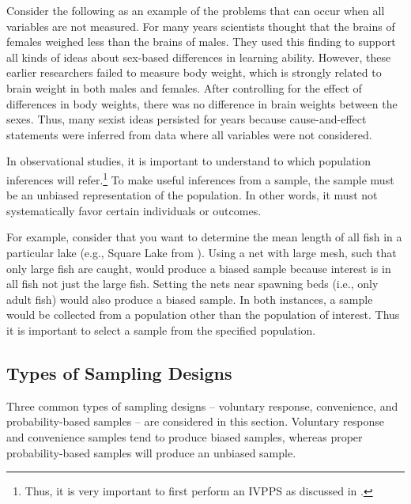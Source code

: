 \documentclass[10pt,openany]{book}\usepackage[]{graphicx}\usepackage[]{color}
\begin{document}
Consider the following as an example of the problems that can occur when all variables are not measured. For many years scientists thought that the brains of females weighed less than the brains of males. They used this finding to support all kinds of ideas about sex-based differences in learning ability. However, these earlier researchers failed to measure body weight, which is strongly related to brain weight in both males and females. After controlling for the effect of differences in body weights, there was no difference in brain weights between the sexes. Thus, many sexist ideas persisted for years because cause-and-effect statements were inferred from data where all variables were not considered.


In observational studies, it is important to understand to which population inferences will refer.\footnote{Thus, it is very important to first perform an IVPPS as discussed in .} To make useful inferences from a sample, the sample must be an unbiased representation of the population. In other words, it must not systematically favor certain individuals or outcomes.

For example, consider that you want to determine the mean length of all fish in a particular lake (e.g., Square Lake from ). Using a net with large mesh, such that only large fish are caught, would produce a biased sample because interest is in all fish not just the large fish. Setting the nets near spawning beds (i.e., only adult fish) would also produce a biased sample. In both instances, a sample would be collected from a population other than the population of interest. Thus it is important to select a sample from the specified population.


\subsection{Types of Sampling Designs}
Three common types of sampling designs -- voluntary response, convenience, and probability-based samples -- are considered in this section. Voluntary response and convenience samples tend to produce biased samples, whereas proper probability-based samples will produce an unbiased sample.
\end{document}
